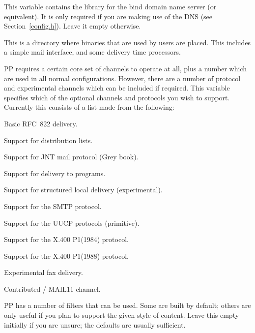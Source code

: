 \begin{describe}
\item[\verb|LIBRESOLV|:] This variable contains the
library for the bind domain name server (or equivalent). It is only
required if you are making use of the DNS (see Section~\ref{config.h}).
Leave it empty otherwise.

\item[\verb|USRBINDIR|:] This is a directory where
binaries that are used by users are placed. This includes a simple
mail interface, and some delivery time processors.

\item[\verb|OPTIONALCHANS|:]
PP requires a certain core set of channels to operate at all, plus a
number which are used in all normal configurations. However, there are
a number of protocol and experimental channels which can be included
if required. This variable specifies
which of the optional channels and protocols you wish to support.
Currently this consists of a list made from the following:
\begin{describe}
\item[\verb|822-local|:]	Basic RFC~822 delivery.
\item[\verb|lists|:]	Support for distribution lists.
\item[\verb|grey|:]	Support for JNT mail protocol (Grey book).
\item[\verb|shell|:]	Support for delivery to programs.
\item[\verb|slocal|:]	Support for structured local delivery (experimental).
\item[\verb|smtp|:]	Support for the SMTP protocol.
\item[\verb|uucp|:]	Support for the UUCP protocols (primitive).
\item[\verb|x40084|:]	Support for the X.400 P1(1984) protocol.
\item[\verb|x40088|:]	Support for the X.400 P1(1988) protocol.
\item[\verb|fax|:]	Experimental fax delivery.
\item[\verb|decnet|:]	Contributed \decnet/ MAIL11 channel.
\end{describe}

\item[\verb|OPTIONALFILTERS|:]
PP has a number of filters that can be used. Some are built by default;
others are only useful if you plan to support the given style of
content. Leave this empty initially if you are unsure; the defaults
are usually sufficient.


\end{describe}
